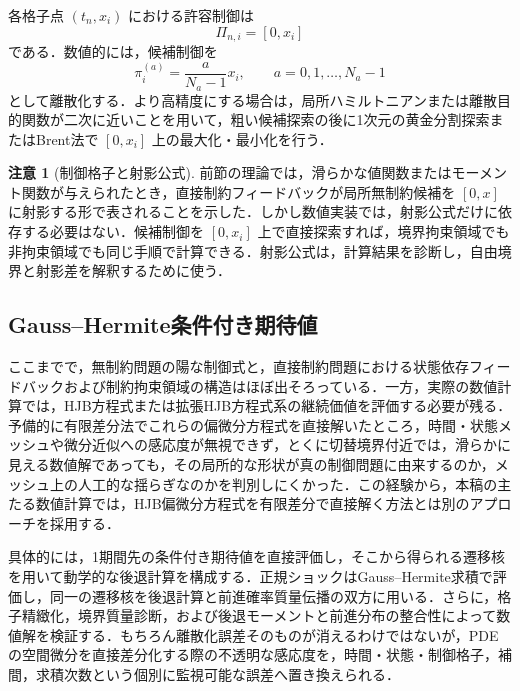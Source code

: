 \documentclass[10pt,a4paper]{article}
\theoremstyle{plain}
\theoremstyle{definition}
\newtheorem{remark}{注意}
\begin{document}
各格子点 $(t_n,x_i)$ における許容制御は
\begin{equation}
  \Pi_{n,i}=[0,x_i]
  \label{eq:control-interval}
\end{equation}
である．数値的には，候補制御を
\begin{equation}
  \pi_i^{(a)}=\frac{a}{N_a-1}x_i,
  \qquad a=0,1,\ldots,N_a-1
  \label{eq:control-grid}
\end{equation}
として離散化する．より高精度にする場合は，局所ハミルトニアンまたは離散目的関数が二次に近いことを用いて，粗い候補探索の後に1次元の黄金分割探索またはBrent法で $[0,x_i]$ 上の最大化・最小化を行う．

\begin{remark}[制御格子と射影公式]
前節の理論では，滑らかな値関数またはモーメント関数が与えられたとき，直接制約フィードバックが局所無制約候補を $[0,x]$ に射影する形で表されることを示した．しかし数値実装では，射影公式だけに依存する必要はない．候補制御を $[0,x_i]$ 上で直接探索すれば，境界拘束領域でも非拘束領域でも同じ手順で計算できる．射影公式は，計算結果を診断し，自由境界と射影差を解釈するために使う．
\end{remark}

\subsection{Gauss--Hermite条件付き期待値}
\label{sec:gh}

ここまでで，無制約問題の陽な制御式と，直接制約問題における状態依存フィードバックおよび制約拘束領域の構造はほぼ出そろっている．一方，実際の数値計算では，HJB方程式または拡張HJB方程式系の継続価値を評価する必要が残る．予備的に有限差分法でこれらの偏微分方程式を直接解いたところ，時間・状態メッシュや微分近似への感応度が無視できず，とくに切替境界付近では，滑らかに見える数値解であっても，その局所的な形状が真の制御問題に由来するのか，メッシュ上の人工的な揺らぎなのかを判別しにくかった．この経験から，本稿の主たる数値計算では，HJB偏微分方程式を有限差分で直接解く方法とは別のアプローチを採用する．

具体的には，1期間先の条件付き期待値を直接評価し，そこから得られる遷移核を用いて動学的な後退計算を構成する．正規ショックはGauss--Hermite求積で評価し，同一の遷移核を後退計算と前進確率質量伝播の双方に用いる．さらに，格子精緻化，境界質量診断，および後退モーメントと前進分布の整合性によって数値解を検証する．もちろん離散化誤差そのものが消えるわけではないが，PDEの空間微分を直接差分化する際の不透明な感応度を，時間・状態・制御格子，補間，求積次数という個別に監視可能な誤差へ置き換えられる．
\end{document}
